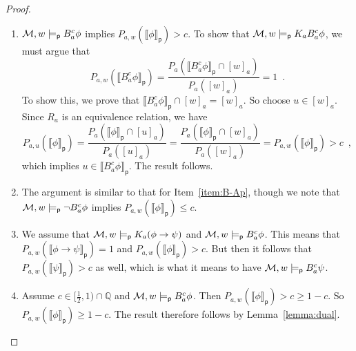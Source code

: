 \documentclass[12pt]{article}
\theoremstyle{definition}
\newcommand{\Rat}{\mathbb{Q}}  %
\newcommand{\M}{{\cal M}}      %
\newcommand{\modelsp}{\models_{\mathsf{p}}}                  %
\newcommand{\semp}[1]{\llbracket{#1}\rrbracket_{\mathsf{p}}} %
\begin{document}
\begin{proof}
\begin{enumerate}
  \item $\M,w\modelsp B_a^c\phi$ implies $P_{a,w}(\semp{\phi})>c$.  To show that
    $\M,w\modelsp K_aB_a^c\phi$, we must argue that
    \[
    P_{a,w}(\semp{B_a^c\phi})= 
    \frac{P_a(\semp{B_a^c\phi}\cap[w]_a)}{P_a([w]_a)}
    =1\enspace.
    \]
    To show this, we prove that
    $\semp{B_a^c\phi}\cap[w]_a=[w]_a$.
    So choose $u\in[w]_a$.  Since $R_a$ is an equivalence relation,
    we have
    \begin{equation*}
      P_{a,u}(\semp{\phi})=
      \frac{P_a(\semp{\phi}\cap[u]_a)}{P_a([u]_a)}=
      \frac{P_a(\semp{\phi}\cap[w]_a)}{P_a([w]_a)}=
      P_{a,w}(\semp{\phi})>c\enspace,
    \end{equation*}
    which implies $u\in\semp{B_a^c\phi}$.  The result follows.
    
  \item The argument is similar to that for Item~\ref{item:B-Ap},
    though we note that $\M,w\modelsp\lnot B_a^c\phi$ implies
    $P_{a,w}(\semp{\phi})\leq c$.
    
  \item We assume that $\M,w\modelsp K_a(\phi\to\psi)$ and
    $\M,w\modelsp B_a^c\phi$.  This means that
    $P_{a,w}(\semp{\phi\to\psi})=1$ and
    $P_{a,w}(\semp{\phi})>c$.  But then it follows that
    $P_{a,w}(\semp{\psi})>c$ as well, which is what it means to
    have $\M,w\modelsp B_a^c\psi$.


  \item Assume $c\in[\frac 12,1)\cap\Rat$ and $\M,w\modelsp B_a^c\phi$.  Then $P_{a,w}(\semp{\phi})>c
    \geq 1 - c$. So $P_{a,w}(\semp{\phi})\geq 1-c$.  The result
    therefore follows by Lemma~\ref{lemma:dual}.


\end{enumerate}
\end{proof}
\end{document}
